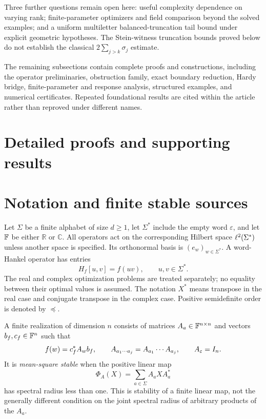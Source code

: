 Three further questions remain open here: useful complexity dependence
on varying rank; finite-parameter optimizers and field comparison beyond
the solved examples; and a uniform multiletter balanced-truncation tail
bound under explicit geometric hypotheses. The Stein-witness truncation
bounds proved below do not establish the classical
$2\sum_{j>k}\sigma_j$ estimate.

The remaining subsections contain complete proofs and constructions, including the
operator preliminaries, obstruction family, exact boundary reduction,
Hardy bridge, finite-parameter and response analysis, structured examples,
and numerical certificates. Repeated foundational results are cited
within the article rather than reproved under different names.
\label{I:I:main-end}

\section*{Detailed proofs and supporting results}

\section{Notation and finite stable sources}\label{I:U:sec:preliminaries}
Let $\Sigma$ be a finite alphabet of size $d\ge1$, let $\Sigma^*$ include
the empty word $\varepsilon$, and let $\mathbb F$ be either $\mathbb R$ or
$\mathbb C$. All operators act on the corresponding Hilbert space
$\ell^2(\Sigma^*)$ unless another space is specified. Its orthonormal basis is
$(e_w)_{w\in\Sigma^*}$. A word-Hankel operator has entries
\[
H_f[u,v]=f(uv),\qquad u,v\in\Sigma^*.
\]
The real and complex optimization problems are treated separately; no
equality between their optimal values is assumed. The notation $X^*$
means transpose in the real case and conjugate transpose in the complex
case. Positive semidefinite order is denoted by $\preceq$.

A finite realization of dimension $n$ consists of matrices
$A_a\in\mathbb F^{n\times n}$ and vectors $b_f,c_f\in\mathbb F^n$ such that
\begin{equation}\label{I:U:eq:realization}
f(w)=c_f^*A_wb_f,
\qquad A_{a_1\cdots a_j}=A_{a_1}\cdots A_{a_j},
\qquad A_\varepsilon=I_n.
\end{equation}
It is \emph{mean-square stable} when the positive linear map
\[
\Phi_A(X)=\sum_{a\in\Sigma}A_aXA_a^*
\]
has spectral radius less than one. This is stability of a finite linear
map, not the generally different condition on the joint spectral radius
of arbitrary products of the $A_a$.

